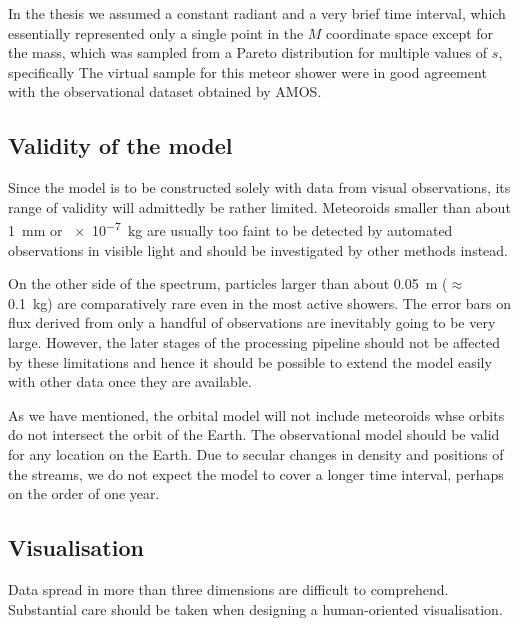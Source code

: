     In the thesis we assumed a constant radiant and a very brief time interval,
    which essentially represented only a single point in the $M$ coordinate space
    except for the mass, which was sampled from a Pareto distribution for multiple values of $s$,
    specifically
    The virtual sample for this meteor shower were in good agreement with the observational dataset
    obtained by AMOS.

    \subsection{Validity of the model} \label{iav}
        Since the model is to be constructed solely with data from visual observations,
        its range of validity will admittedly be rather limited.
        Meteoroids smaller than about \SI{1}{\milli\metre} or \SI{e-7}{\kilo\gram} are usually too faint
        to be detected by automated observations in visible light and should be investigated
        by other methods instead.

        On the other side of the spectrum, particles larger than about \SI{0.05}{\metre} ($\approx$ \SI{0.1}{\kilo\gram})
        are comparatively rare even in the most active showers.
        The error bars on flux derived from only a handful of observations are inevitably going to be very large.
        However, the later stages of the processing pipeline should not be affected by these limitations
        and hence it should be possible to extend the model easily with other data once they are available.

        As we have mentioned, the orbital model will not include meteoroids whse orbits do not
        intersect the orbit of the Earth. The observational model should be valid for any location on the Earth.
        Due to secular changes in density and positions of the streams, we do not expect the model to cover
        a longer time interval, perhaps on the order of one year.

    \subsection{Visualisation} \label{iov}
        Data spread in more than three dimensions are difficult to comprehend.
        Substantial care should be taken when designing a human-oriented visualisation.

